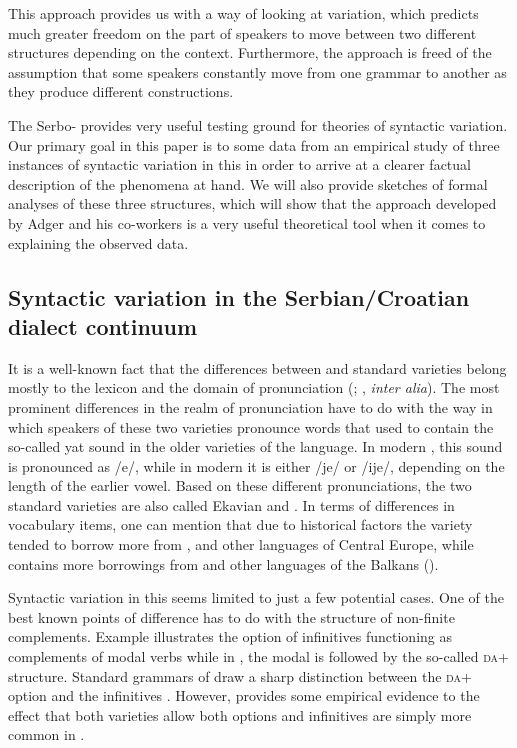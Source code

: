 \documentclass[output=paper,modfonts,newtxmath,hidelinks,]{langscibook}
\begin{document}
This approach provides us with a way of looking at variation, which predicts much greater freedom on the part of speakers to move between two different structures depending on the context. Furthermore, the approach is freed of the assumption that some speakers constantly move from one grammar to another as they produce different constructions.

The Serbo-  provides very useful testing ground for theories of syntactic variation. Our primary goal in this paper is to  some data from an empirical study of three instances of syntactic variation in this  in order to arrive at a clearer factual description of the phenomena at hand. We will also provide sketches of formal analyses of these three structures, which will show that the approach developed by Adger and his co-workers is a very useful theoretical tool when it comes to explaining the observed data.

\subsection{Syntactic variation in the Serbian/Croatian dialect continuum}\label{7:s1.2}

It is a well-known fact that the differences between  and  standard varieties belong mostly to the lexicon and the domain of pronunciation (\citealt{CorbettBrowne2009}; \citealt{Bailyn2010}, \textit{inter alia}). The most prominent differences in the realm of pronunciation have to do with the way in which speakers of these two varieties pronounce words that used to contain the so-called yat sound in the older varieties of the language. In modern , this sound is pronounced as /e/, while in modern  it is either /je/ or /ije/, depending on the length of the earlier vowel. Based on these different pronunciations, the two standard varieties are also called Ekavian and . In terms of differences in vocabulary items, one can mention that due to historical factors the  variety tended to borrow more from ,  and other languages of Central Europe, while  contains more borrowings from  and other languages of the Balkans (\citealt{CorbettBrowne2009}).

Syntactic variation in this  seems limited to just a few potential cases. One of the best known points of difference has to do with the structure of non-finite  complements. Example  illustrates the option of infinitives functioning as complements of modal verbs while in , the modal is followed by the so-called \textsc{da}+ structure. Standard grammars of  draw a sharp distinction between the  \textsc{da}+ option and the  infinitives \citep{Katicic}. However, \citet{Bailyn2010} provides some empirical evidence to the effect that both varieties allow both options and infinitives are simply more common in .
\end{document}
